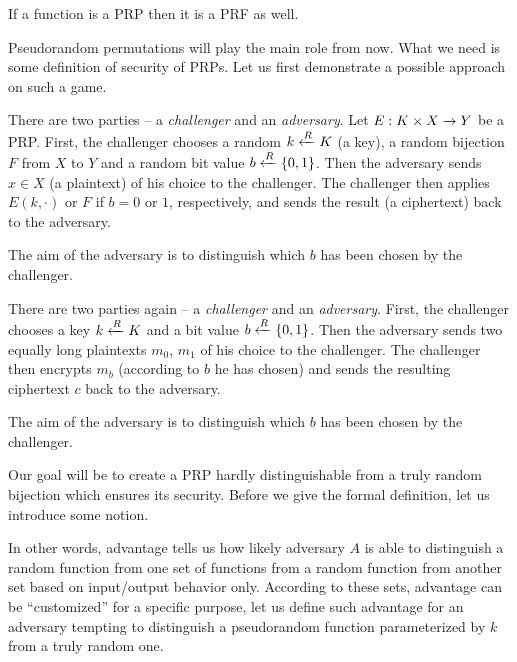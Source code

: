 \begin{note}
	If a function is a PRP then it is a PRF as well.
\end{note}

Pseudorandom permutations will play the main role from now. What we need is some definition of security of PRPs. Let us first demonstrate a possible approach on such a game.


\begin{game}
\label{game:prp}
	There are two parties -- a {\em challenger} and an {\em adversary}. Let $E:K\times X\rightarrow Y$ be a PRP. First, the challenger chooses a random $k\xleftarrow{R} K$ (a key), a random bijection $F$ from $X$ to $Y$ and a random bit value $b\xleftarrow{R}\{0,1\}$. Then the adversary sends $x\in X$ (a plaintext) of his choice to the challenger. The challenger then applies $E(k,\cdot)$ or $F$ if $b=0$ or $1$, respectively, and sends the result (a ciphertext) back to the adversary.
	
	The aim of the adversary is to distinguish which $b$ has been chosen by the challenger.
	
	
	
	
	There are two parties again -- a {\em challenger} and an {\em adversary}. First, the challenger chooses a key $k\xleftarrow{R} K$ and a bit value $b\xleftarrow{R}\{0,1\}$. Then the adversary sends two equally long plaintexts $m_0$, $m_1$ of his choice to the challenger. The challenger then encrypts $m_b$ (according to $b$ he has chosen) and sends the resulting ciphertext $c$ back to the adversary.
	
	The aim of the adversary is to distinguish which $b$ has been chosen by the challenger.
\end{game}

Our goal will be to create a PRP hardly distinguishable from a truly random bijection which ensures its security. Before we give the formal definition, let us introduce some notion.

In other words, advantage tells us how likely adversary $A$ is able to distinguish a random function from one set of functions from a random function from another set based on input/output behavior only. According to these sets, advantage can be ``customized'' for a specific purpose, let us define such advantage for an adversary tempting to distinguish a pseudorandom function parameterized by $k$ from a truly random one.

